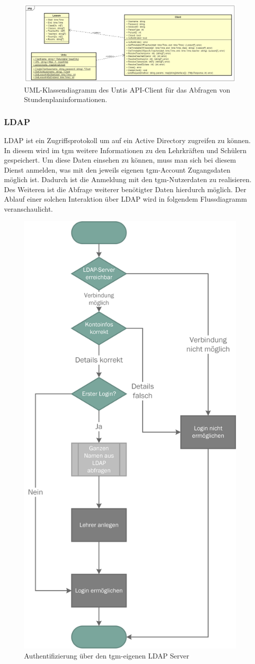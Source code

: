 \begin{figure}[H]
	\centering
	\includegraphics[width=\linewidth]{images/mbeier_konzept/Untis}
	\caption[Untis API-Client UML-Klassendiagramm]{UML-Klassendiagramm des Untis API-Client für das Abfragen von Stundenplaninformationen.}
	\label{fig:untis}
\end{figure}

\newpage

\subsubsection{LDAP}

LDAP ist ein Zugriffsprotokoll um auf ein Active Directory zugreifen zu können. In diesem wird im tgm weitere Informationen zu den Lehrkräften und Schülern gespeichert. Um diese Daten einsehen zu können, muss man sich bei diesem Dienst anmelden, was mit den jeweils eigenen tgm-Account Zugangsdaten möglich ist. Dadurch ist die Anmeldung mit den tgm-Nutzerdaten zu realisieren. Des Weiteren ist die Abfrage weiterer benötigter Daten hierdurch möglich. Der Ablauf einer solchen Interaktion über LDAP wird in folgendem Flussdiagramm veranschaulicht.

\begin{figure}[H]
	\centering
	\includegraphics[width=0.5\linewidth]{images/mbeier_konzept/LDAP_Authenticate}
	\caption[Authentifizierung über LDAP]{Authentifizierung über den tgm-eigenen LDAP Server}
	\label{fig:ldapauthenticate}
\end{figure}

